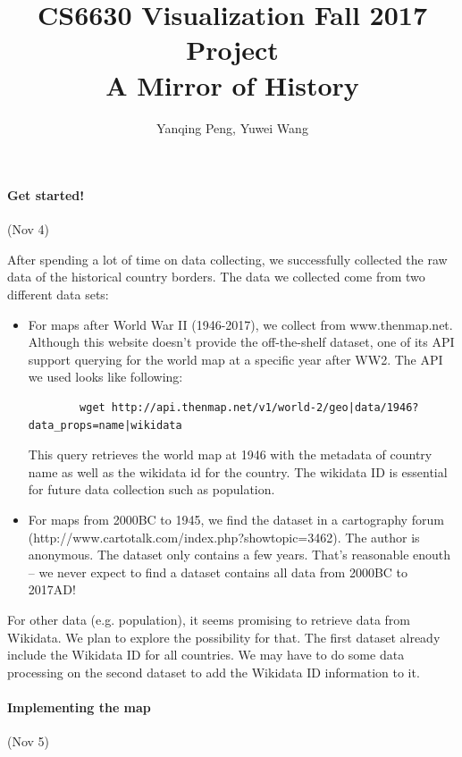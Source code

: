 \documentclass[12pt, fullpage,letterpaper]{article}
\title{CS6630 Visualization Fall 2017 Project \\ A Mirror of History}
\author{Yanqing Peng, Yuwei Wang}
\begin{document}
\maketitle
\newpage
\paragraph{Get started!} (Nov 4)

After spending a lot of time on data collecting, we successfully collected
the raw data of the historical country borders. The data we collected come
from two different data sets:

\begin{itemize}
    \item For maps after World War II (1946-2017), we collect from www.thenmap.net.
        Although this website doesn't provide the off-the-shelf dataset, one of its
        API support querying for the world map at a specific year after WW2. The API
        we used looks like following:

        \begin{verbatim}
        wget http://api.thenmap.net/v1/world-2/geo|data/1946?data_props=name|wikidata
        \end{verbatim}

        This query retrieves the world map at 1946 with the metadata of country name as well as
        the wikidata id for the country. The wikidata ID is essential for future data collection
        such as population.

    \item For maps from 2000BC to 1945, we find the dataset in a cartography forum (http://www.cartotalk.com/index.php?showtopic=3462).
        The author is anonymous.
        The dataset only contains a few years. That's reasonable enouth -- we never expect to
        find a dataset contains all data from 2000BC to 2017AD!

\end{itemize}

For other data (e.g. population), it seems promising to retrieve data from Wikidata.
We plan to explore the possibility for that.
The first dataset already include the Wikidata ID for all countries.
We may have to do some data processing on the second dataset to add the Wikidata ID information to it.

\newpage
\paragraph{Implementing the map} (Nov 5)
\end{document}
